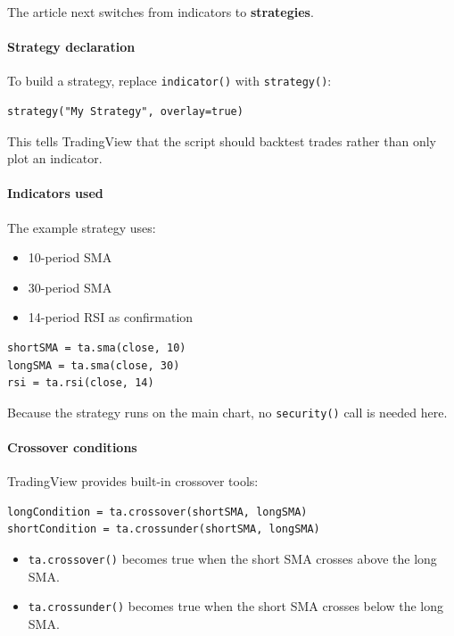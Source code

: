 \documentclass[12pt,openany]{book}
\begin{document}
The article next switches from indicators to \textbf{strategies}.

\paragraph{Strategy declaration}

To build a strategy, replace \texttt{indicator()} with \texttt{strategy()}:

\begin{Verbatim}[breaklines=true,breakanywhere=true,fontsize=\small]
strategy("My Strategy", overlay=true)
\end{Verbatim}

This tells TradingView that the script should backtest trades rather than only plot an indicator.

\paragraph{Indicators used}

The example strategy uses:

\begin{itemize}[leftmargin=*]
    \item 10-period SMA
    \item 30-period SMA
    \item 14-period RSI as confirmation
\end{itemize}

\begin{Verbatim}[breaklines=true,breakanywhere=true,fontsize=\small]
shortSMA = ta.sma(close, 10)
longSMA = ta.sma(close, 30)
rsi = ta.rsi(close, 14)
\end{Verbatim}

Because the strategy runs on the main chart, no \texttt{security()} call is needed here.

\paragraph{Crossover conditions}

TradingView provides built-in crossover tools:

\begin{Verbatim}[breaklines=true,breakanywhere=true,fontsize=\small]
longCondition = ta.crossover(shortSMA, longSMA)
shortCondition = ta.crossunder(shortSMA, longSMA)
\end{Verbatim}

\begin{itemize}[leftmargin=*]
    \item \texttt{ta.crossover()} becomes true when the short SMA crosses above the long SMA.
    \item \texttt{ta.crossunder()} becomes true when the short SMA crosses below the long SMA.
\end{itemize}
\end{document}
